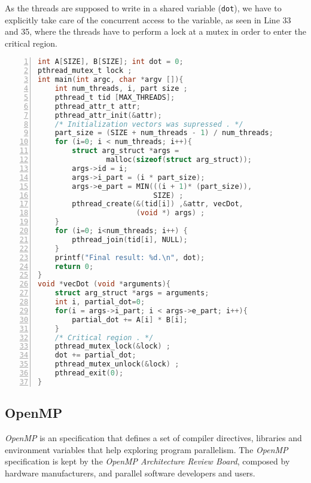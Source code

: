 As the threads are supposed to write in a shared variable (\texttt{dot}), we
have to explicitly take care of the concurrent access to the variable, as seen
in Line 33 and 35, where the threads have to perform a lock at a mutex in order
to enter the critical region.

\begin{lstlisting}[language=C, basicstyle=\ttfamily\scriptsize, numbers=left,
                   frame=no, showspaces=false, showstringspaces=false,
                   caption={\textit{Pthreads} Sample Program}, captionpos=b,
                   numberstyle=\tiny,
                   xleftmargin=0.5cm,
                   label=lst:listing-pthreads, keywords={%
                       DATATYPE, pthread_t, pthread_create,
                       pthread_join, task_function, NULL, int, main,
                       void, printf, return%
                       },
                   otherkeywords={::, \#pragma, \#include, <<<,>>>, \&, \*, +, -, /, [, ], >, <}
                   ]
int A[SIZE], B[SIZE]; int dot = 0;
pthread_mutex_t lock ;
int main(int argc, char *argv []){ 
    int num_threads, i, part size ;
    pthread_t tid [MAX_THREADS];
    pthread_attr_t attr; 
    pthread_attr_init(&attr);
    /* Initialization vectors was supressed . */
    part_size = (SIZE + num_threads - 1) / num_threads;
    for (i=0; i < num_threads; i++){
        struct arg_struct *args = 
                malloc(sizeof(struct arg_struct));
        args->id = i;
        args->i_part = (i * part_size);
        args->e_part = MIN(((i + 1)* (part_size)), 
                           SIZE) ;
        pthread_create(&(tid[i]) ,&attr, vecDot, 
                       (void *) args) ;
    }
    for (i=0; i<num_threads; i++) { 
        pthread_join(tid[i], NULL);
    }
    printf("Final result: %d.\n", dot); 
    return 0;
}
void *vecDot (void *arguments){
    struct arg_struct *args = arguments;
    int i, partial_dot=0;
    for(i = args->i_part; i < args->e_part; i++){
        partial_dot += A[i] * B[i]; 
    }
    /* Critical region . */ 
    pthread_mutex_lock(&lock) ; 
    dot += partial_dot;
    pthread_mutex_unlock(&lock) ;
    pthread_exit(0); 
}
\end{lstlisting}

\subsection{OpenMP}

\textit{OpenMP} is an specification that defines a set of compiler directives,
libraries and environment variables that help exploring program parallelism.
The \textit{OpenMP} specification is kept by the \textit{OpenMP Architecture
Review Board}, composed by hardware manufacturers, and parallel software
developers and users.

